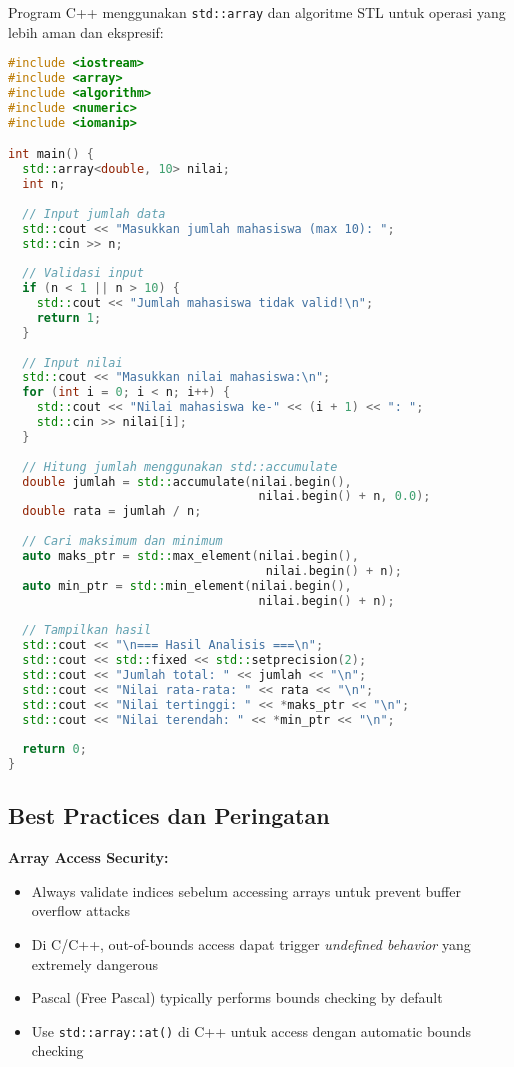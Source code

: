 \documentclass[../main.tex]{subfiles}
\begin{document}
Program C++ menggunakan \texttt{std::array} dan algoritme STL untuk operasi yang lebih aman dan ekspresif:

\begin{lstlisting}[language=C++, caption={Program lengkap array 1D di C++}]
#include <iostream>
#include <array>
#include <algorithm>
#include <numeric>
#include <iomanip>

int main() {
  std::array<double, 10> nilai;
  int n;
  
  // Input jumlah data
  std::cout << "Masukkan jumlah mahasiswa (max 10): ";
  std::cin >> n;
  
  // Validasi input
  if (n < 1 || n > 10) {
    std::cout << "Jumlah mahasiswa tidak valid!\n";
    return 1;
  }
  
  // Input nilai
  std::cout << "Masukkan nilai mahasiswa:\n";
  for (int i = 0; i < n; i++) {
    std::cout << "Nilai mahasiswa ke-" << (i + 1) << ": ";
    std::cin >> nilai[i];
  }
  
  // Hitung jumlah menggunakan std::accumulate
  double jumlah = std::accumulate(nilai.begin(), 
                                   nilai.begin() + n, 0.0);
  double rata = jumlah / n;
  
  // Cari maksimum dan minimum
  auto maks_ptr = std::max_element(nilai.begin(), 
                                    nilai.begin() + n);
  auto min_ptr = std::min_element(nilai.begin(), 
                                   nilai.begin() + n);
  
  // Tampilkan hasil
  std::cout << "\n=== Hasil Analisis ===\n";
  std::cout << std::fixed << std::setprecision(2);
  std::cout << "Jumlah total: " << jumlah << "\n";
  std::cout << "Nilai rata-rata: " << rata << "\n";
  std::cout << "Nilai tertinggi: " << *maks_ptr << "\n";
  std::cout << "Nilai terendah: " << *min_ptr << "\n";
  
  return 0;
}
\end{lstlisting}

\subsection{Best Practices dan Peringatan}

\textbf{Array Access Security:}
\begin{itemize}
  \item Always validate indices sebelum accessing arrays untuk prevent buffer overflow attacks
  \item Di C/C++, out-of-bounds access dapat trigger \textit{undefined behavior} yang extremely dangerous
  \item Pascal (Free Pascal) typically performs bounds checking by default
  \item Use \texttt{std::array::at()} di C++ untuk access dengan automatic bounds checking
\end{itemize}
\end{document}
